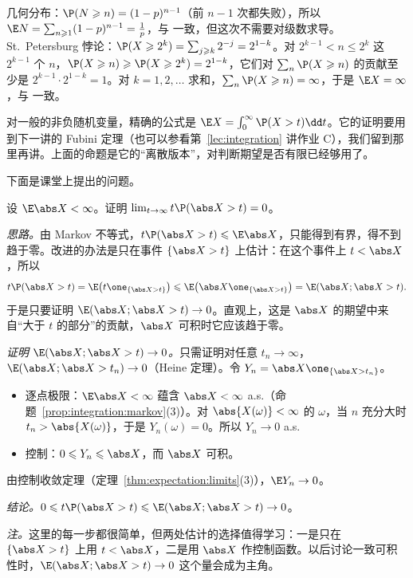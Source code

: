 \begin{example}
几何分布：$\P(N\geqslant n)=(1-p)^{n-1}$（前 $n-1$ 次都失败），所以 $\E N=\sum_{n\geqslant1}(1-p)^{n-1}=\frac1p$，与 一致，但这次不需要对级数求导。St.\ Petersburg 悖论：$\P(X\geqslant2^k)=\sum_{j\geqslant k}2^{-j}=2^{1-k}$。对 $2^{k-1}<n\leqslant2^k$ 这 $2^{k-1}$ 个 $n$，$\P(X\geqslant n)\geqslant \P(X\geqslant2^k)=2^{1-k}$，它们对 $\sum_n\P(X\geqslant n)$ 的贡献至少是 $2^{k-1}\cdot2^{1-k}=1$。对 $k=1,2,\dots$ 求和，$\sum_n\P(X\geqslant n)=\infty$，于是 $\E X=\infty$，与 一致。
\end{example}

对一般的非负随机变量，精确的公式是 $\E X=\int_0^\infty \P(X>t)\dd t$。它的证明要用到下一讲的 Fubini 定理（也可以参看第~\ref{lec:integration} 讲作业 C），我们留到那里再讲。上面的命题是它的“离散版本”，对判断期望是否有限已经够用了。

下面是课堂上提出的问题。

\begin{workedexample}\label{we:expectation:tP}
设 $\E\abs X<\infty$。证明 $\lim_{t\to\infty}t\P(\abs X>t)=0$。
\end{workedexample}
\begin{solution}
\emph{思路。}由 Markov 不等式，$t\P(\abs X>t)\leqslant \E\abs X$，只能得到有界，得不到趋于零。改进的办法是只在事件 $\{\abs X>t\}$ 上估计：在这个事件上 $t<\abs X$，所以
\[
t\P(\abs X>t)=\E\bigl(t\one_{\{\abs X>t\}}\bigr)\leqslant \E\bigl(\abs X\one_{\{\abs X>t\}}\bigr)=\E(\abs X;\abs X>t).
\]
于是只要证明 $\E(\abs X;\abs X>t)\to0$。直观上，这是 $\abs X$ 的期望中来自“大于 $t$ 的部分”的贡献，$\abs X$ 可积时它应该趋于零。

\emph{证明 $\E(\abs X;\abs X>t)\to0$。}只需证明对任意 $t_n\to\infty$，$\E(\abs X;\abs X>t_n)\to0$（Heine 定理）。令 $Y_n=\abs X\one_{\{\abs X>t_n\}}$。
\begin{itemize}
\item 逐点极限：$\E\abs X<\infty$ 蕴含 $\abs X<\infty$ a.s.（命题~\ref{prop:integration:markov}(3)）。对 $\abs{X(\omega)}<\infty$ 的 $\omega$，当 $n$ 充分大时 $t_n>\abs{X(\omega)}$，于是 $Y_n(\omega)=0$。所以 $Y_n\to0$ a.s.
\item 控制：$0\leqslant Y_n\leqslant\abs X$，而 $\abs X$ 可积。
\end{itemize}
由控制收敛定理（定理~\ref{thm:expectation:limits}(3)），$\E Y_n\to0$。

\emph{结论。}$0\leqslant t\P(\abs X>t)\leqslant \E(\abs X;\abs X>t)\to0$。

\emph{注。}这里的每一步都很简单，但两处估计的选择值得学习：一是只在 $\{\abs X>t\}$ 上用 $t<\abs X$，二是用 $\abs X$ 作控制函数。以后讨论一致可积性时，$\E(\abs X;\abs X>t)\to0$ 这个量会成为主角。
\end{solution}

